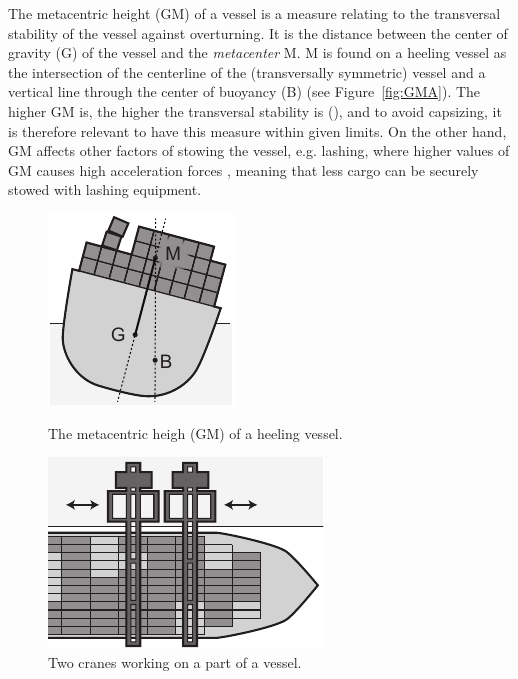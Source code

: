 The metacentric height (GM) of a vessel is a measure relating to the transversal stability of the vessel against overturning. It is the distance between the center of gravity (G) of the vessel and the \emph{metacenter} M. M is found on a heeling vessel as the intersection of the centerline of the (transversally symmetric) vessel and a vertical line through the center of buoyancy (B) (see Figure~\ref{fig:GMA}). The higher GM is, the higher the transversal stability is (\cite{JPAV18}), and to avoid capsizing, it is therefore relevant to have this measure within given limits. 
On the other hand, GM affects other factors of stowing the vessel, e.g. lashing, where {higher} values of GM causes high acceleration forces , meaning that less cargo can be securely stowed with lashing equipment. 

\begin{figure}
	\centering
	\begin{minipage}{.5\textwidth}
  		\centering
  		\includegraphics{figures/GM.pdf}
  		\caption{The metacentric heigh (GM) of a heeling vessel.}
  		\label{fig:GMA}
	\end{minipage}%
	\begin{minipage}{.5\textwidth}
  		\centering
  		\includegraphics{figures/cranes.pdf}
  		\caption{Two cranes working on a part of a vessel.}
  		\label{fig:cranes}
	\end{minipage}
\end{figure}

